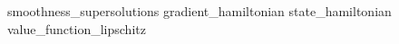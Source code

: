 \begin{appendices}
	\chapter[Appendices]{}
	{smoothness_supersolutions}
	{gradient_hamiltonian}
	{state_hamiltonian}
	{value_function_lipschitz}
\end{appendices}